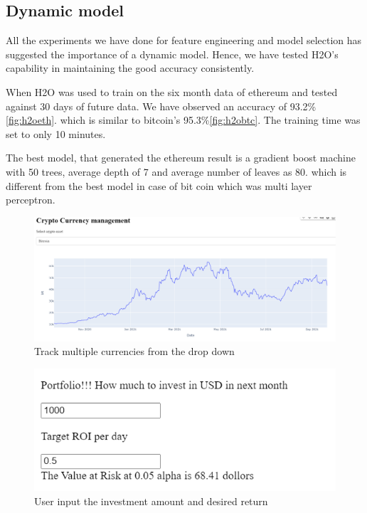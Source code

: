\documentclass[final]{cvpr}
\begin{document}
\subsection{Dynamic model}

All the experiments we have done for feature engineering and model selection has suggested the importance of a dynamic model. Hence, we have tested H2O's capability in maintaining the good accuracy consistently.

When H2O was used to train on the six month data of ethereum and tested against 30 days of future data. We have observed an accuracy of  93.2\%\ref{fig:h2oeth}. which is similar to bitcoin's 95.3\%\ref{fig:h2obtc}. The training time was set to only 10 minutes.


The best model, that generated the ethereum result is a gradient boost machine with 50 trees, average depth of 7 and average number of leaves as 80. which is different from the best model in case of bit coin which was multi layer perceptron. 

\begin{figure}[h!]
\begin{center}
\includegraphics[width=0.8\linewidth]{latex/bitcoin_web app.PNG}
\end{center}
   \caption{Track multiple currencies from the drop down}
\label{fig:track}
\end{figure}

\begin{figure}[h!]
\begin{center}
\includegraphics[width=0.8\linewidth]{latex/investment.PNG}
\end{center}
   \caption{User input the investment amount and desired return }
\label{fig:inv}
\end{figure}
\end{document}
